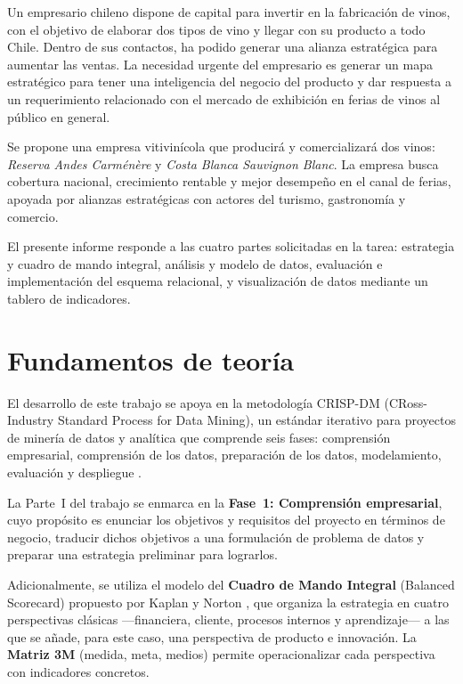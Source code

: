 \documentclass[10pt,a4paper]{article}
\begin{document}
Un empresario chileno dispone de capital para invertir en la fabricaci\'on de vinos, con el objetivo de elaborar dos tipos de vino y llegar con su producto a todo Chile. Dentro de sus contactos, ha podido generar una alianza estrat\'egica para aumentar las ventas. La necesidad urgente del empresario es generar un mapa estrat\'egico para tener una inteligencia del negocio del producto y dar respuesta a un requerimiento relacionado con el mercado de exhibici\'on en ferias de vinos al p\'ublico en general.

Se propone una empresa vitivin\'icola que producir\'a y comercializar\'a dos vinos: \textit{Reserva Andes Carm\'en\`ere} y \textit{Costa Blanca Sauvignon Blanc}. La empresa busca cobertura nacional, crecimiento rentable y mejor desempe\~no en el canal de ferias, apoyada por alianzas estrat\'egicas con actores del turismo, gastronom\'ia y comercio.

El presente informe responde a las cuatro partes solicitadas en la tarea: estrategia y cuadro de mando integral, an\'alisis y modelo de datos, evaluaci\'on e implementaci\'on del esquema relacional, y visualizaci\'on de datos mediante un tablero de indicadores.

\section{Fundamentos de teor\'ia}

El desarrollo de este trabajo se apoya en la metodolog\'ia CRISP-DM (CRoss-Industry Standard Process for Data Mining), un est\'andar iterativo para proyectos de miner\'ia de datos y anal\'itica que comprende seis fases: comprensi\'on empresarial, comprensi\'on de los datos, preparaci\'on de los datos, modelamiento, evaluaci\'on y despliegue \cite{crisp2000}.

La Parte~I del trabajo se enmarca en la \textbf{Fase~1: Comprensi\'on empresarial}, cuyo prop\'osito es enunciar los objetivos y requisitos del proyecto en t\'erminos de negocio, traducir dichos objetivos a una formulaci\'on de problema de datos y preparar una estrategia preliminar para lograrlos.

Adicionalmente, se utiliza el modelo del \textbf{Cuadro de Mando Integral} (Balanced Scorecard) propuesto por Kaplan y Norton \cite{kaplan1996}, que organiza la estrategia en cuatro perspectivas cl\'asicas ---financiera, cliente, procesos internos y aprendizaje--- a las que se a\~nade, para este caso, una perspectiva de producto e innovaci\'on. La \textbf{Matriz 3M} (medida, meta, medios) permite operacionalizar cada perspectiva con indicadores concretos.
\end{document}
